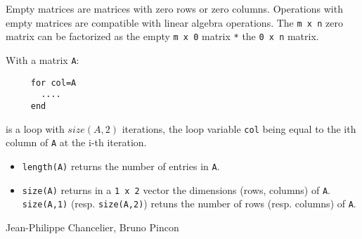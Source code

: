 Empty matrices are matrices with zero rows or zero columns. Operations with empty matrices
are compatible with linear algebra operations. The \verb+m x n+ zero matrix can be 
factorized as the empty \verb+m x 0+ matrix \verb+*+ the \verb+0 x n+ matrix. 

With a matrix \verb+A+:
\begin{verbatim}
     for col=A
       ....
     end
\end{verbatim} 
is a loop with $size(A,2)$ iterations, the loop 
variable  \verb+col+ being equal to the ith column of \verb+A+ at the i-th iteration.

\begin{itemize}
   \item \verb+length(A)+ returns the number of entries in \verb+A+.
   \item \verb+size(A)+ returns in a \verb+1 x 2+ vector the dimensions (rows, columns)
of \verb+A+. \verb+size(A,1)+ (resp. \verb+size(A,2)+) retuns the number of rows 
(resp. columns) of \verb+A+.
\end{itemize}


\begin{manseealso}

\end{manseealso}

\begin{authors}
   Jean-Philippe Chancelier, Bruno Pincon
\end{authors}
